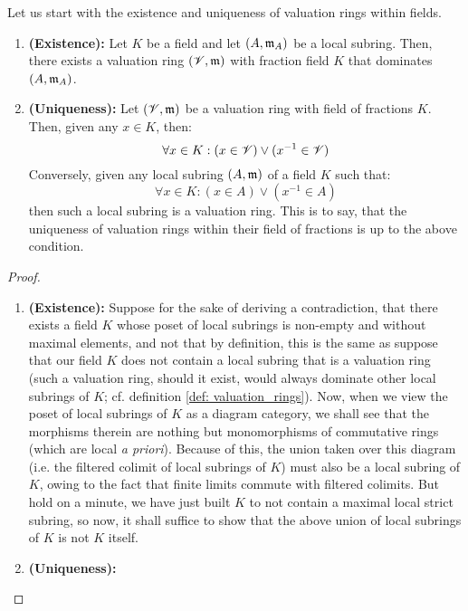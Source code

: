                 Let us start with the existence and uniqueness of valuation rings within fields. 
                \begin{lemma} \label{lemma: valuation_rings_existence_and_uniqueness}
                    \noindent
                    \begin{enumerate}
                        \item \textbf{(Existence):} Let $K$ be a field and let $(A, \mathfrak{m}_A)$ be a local subring. Then, there exists a valuation ring $(\mathscr{V}, \mathfrak{m})$ with fraction field $K$ that dominates $(A, \mathfrak{m}_A)$.
                        \item \textbf{(Uniqueness):} Let $(\mathscr{V}, \mathfrak{m})$ be a valuation ring with field of fractions $K$. Then, given any $x \in K$, then:
                            $$\forall x \in K: (x \in \mathscr{V}) \vee (x^{-1} \in \mathscr{V})$$
                        Conversely, given any local subring $(A, \mathfrak{m})$ of a field $K$ such that:
                            $$\forall x \in K: (x \in A) \vee (x^{-1} \in A)$$
                        then such a local subring is a valuation ring. This is to say, that the uniqueness of valuation rings within their field of fractions is up to the above condition.
                    \end{enumerate}
                \end{lemma}
                    \begin{proof}
                        \noindent
                        \begin{enumerate}
                            \item \textbf{(Existence):} Suppose for the sake of deriving a contradiction, that there exists a field $K$ whose poset of local subrings is non-empty and without maximal elements, and not that by definition, this is the same as suppose that our field $K$ does not contain a local subring that is a valuation ring (such a valuation ring, should it exist, would always dominate other local subrings of $K$; cf. definition \ref{def: valuation_rings}). Now, when we view the poset of local subrings of $K$ as a diagram category, we shall see that the morphisms therein are nothing but monomorphisms of commutative rings (which are local \textit{a priori}). Because of this, the union taken over this diagram (i.e. the filtered colimit of local subrings of $K$) must also be a local subring of $K$, owing to the fact that finite limits commute with filtered colimits. But hold on a minute, we have just built $K$ to not contain a maximal local strict subring, so now, it shall suffice to show that the above union of local subrings of $K$ is not $K$ itself.
                            \item \textbf{(Uniqueness):}
                        \end{enumerate}
                    \end{proof}
                    
